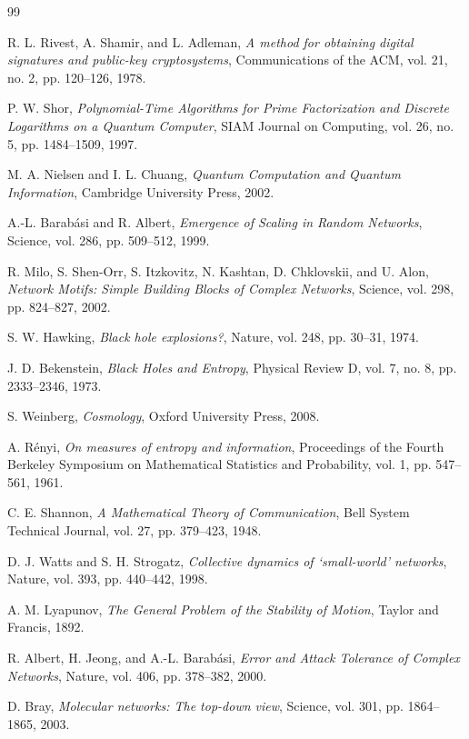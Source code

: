 \documentclass[12pt]{article}
\begin{document}
\begin{thebibliography}{99}

R. L. Rivest, A. Shamir, and L. Adleman, \emph{A method for obtaining digital signatures and public-key cryptosystems}, Communications of the ACM, vol. 21, no. 2, pp. 120–126, 1978.

P. W. Shor, \emph{Polynomial-Time Algorithms for Prime Factorization and Discrete Logarithms on a Quantum Computer}, SIAM Journal on Computing, vol. 26, no. 5, pp. 1484–1509, 1997.

M. A. Nielsen and I. L. Chuang, \emph{Quantum Computation and Quantum Information}, Cambridge University Press, 2002.

A.-L. Barabási and R. Albert, \emph{Emergence of Scaling in Random Networks}, Science, vol. 286, pp. 509–512, 1999.

R. Milo, S. Shen-Orr, S. Itzkovitz, N. Kashtan, D. Chklovskii, and U. Alon, \emph{Network Motifs: Simple Building Blocks of Complex Networks}, Science, vol. 298, pp. 824–827, 2002.

S. W. Hawking, \emph{Black hole explosions?}, Nature, vol. 248, pp. 30–31, 1974.

J. D. Bekenstein, \emph{Black Holes and Entropy}, Physical Review D, vol. 7, no. 8, pp. 2333–2346, 1973.

S. Weinberg, \emph{Cosmology}, Oxford University Press, 2008.

A. Rényi, \emph{On measures of entropy and information}, Proceedings of the Fourth Berkeley Symposium on Mathematical Statistics and Probability, vol. 1, pp. 547–561, 1961.

C. E. Shannon, \emph{A Mathematical Theory of Communication}, Bell System Technical Journal, vol. 27, pp. 379–423, 1948.

D. J. Watts and S. H. Strogatz, \emph{Collective dynamics of ‘small-world’ networks}, Nature, vol. 393, pp. 440–442, 1998.

A. M. Lyapunov, \emph{The General Problem of the Stability of Motion}, Taylor and Francis, 1892.

R. Albert, H. Jeong, and A.-L. Barabási, \emph{Error and Attack Tolerance of Complex Networks}, Nature, vol. 406, pp. 378–382, 2000.

D. Bray, \emph{Molecular networks: The top-down view}, Science, vol. 301, pp. 1864–1865, 2003.


\end{thebibliography}
\end{document}
